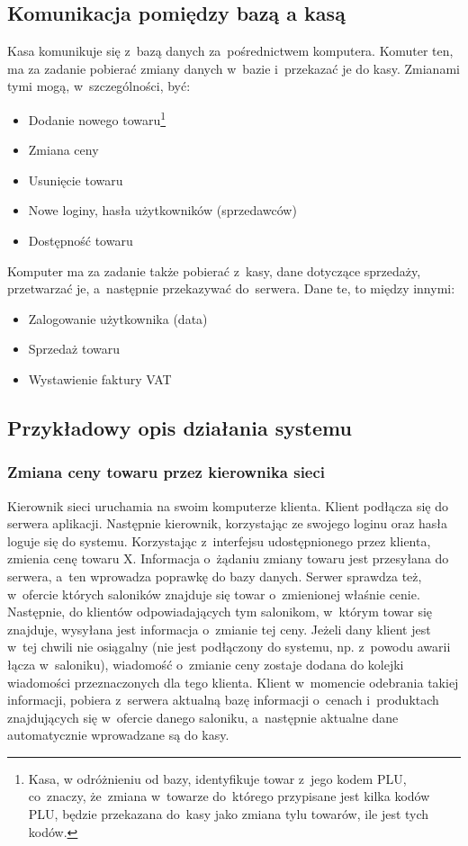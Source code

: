 \subsection{Komunikacja pomiędzy bazą a kasą}
Kasa komunikuje się z~bazą danych za~pośrednictwem komputera. Komuter ten, ma za zadanie pobierać zmiany danych  w~bazie i~przekazać je do kasy. Zmianami tymi mogą, w~szczególności, być:
\begin{itemize}
\item Dodanie nowego towaru\footnote{Kasa, w odróżnieniu od bazy, identyfikuje towar z~jego kodem PLU, co~znaczy, że~zmiana w~towarze do~którego przypisane jest kilka kodów PLU, będzie przekazana do~kasy jako zmiana tylu towarów, ile jest tych kodów.}
\item Zmiana ceny
\item Usunięcie towaru
\item Nowe loginy, hasła użytkowników (sprzedawców)
\item Dostępność towaru 
\end{itemize} 
Komputer ma za zadanie także pobierać z~kasy, dane dotyczące sprzedaży, przetwarzać je, a~następnie przekazywać do~serwera. Dane te, to między innymi:
\begin{itemize}
\item Zalogowanie użytkownika (data)
\item Sprzedaż towaru
\item Wystawienie faktury VAT
\end{itemize} 
\subsection{Przykładowy opis działania systemu}
\subsubsection{Zmiana ceny towaru przez kierownika sieci}
Kierownik sieci uruchamia na swoim komputerze klienta. Klient podłącza się do serwera aplikacji. Następnie kierownik, korzystając ze swojego loginu oraz hasła loguje się do systemu. Korzystając z~interfejsu udostępnionego przez klienta, zmienia cenę towaru X. Informacja o~żądaniu zmiany towaru jest przesyłana do serwera, a~ten wprowadza poprawkę do bazy danych. Serwer sprawdza też, w~ofercie których saloników znajduje się towar o~zmienionej właśnie cenie. Następnie, do klientów odpowiadających tym salonikom, w~którym towar się znajduje, wysyłana jest informacja o~zmianie tej ceny. Jeżeli dany klient jest w~tej chwili nie osiągalny (nie jest podłączony do systemu, np. z~powodu awarii łącza w~saloniku), wiadomość o~zmianie ceny zostaje dodana do kolejki wiadomości przeznaczonych dla tego klienta. Klient w~momencie odebrania takiej informacji, pobiera z~serwera aktualną bazę informacji o~cenach i~produktach znajdujących się w~ofercie danego saloniku, a~następnie aktualne dane automatycznie wprowadzane są do kasy.
